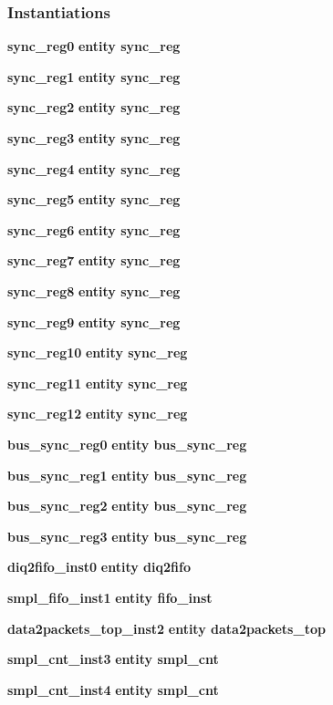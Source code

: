 \subsubsection*{Instantiations}
 \begin{DoxyCompactItemize}
\item 
{\bf sync\+\_\+reg0}  {\bfseries entity sync\+\_\+reg}   
\item 
{\bf sync\+\_\+reg1}  {\bfseries entity sync\+\_\+reg}   
\item 
{\bf sync\+\_\+reg2}  {\bfseries entity sync\+\_\+reg}   
\item 
{\bf sync\+\_\+reg3}  {\bfseries entity sync\+\_\+reg}   
\item 
{\bf sync\+\_\+reg4}  {\bfseries entity sync\+\_\+reg}   
\item 
{\bf sync\+\_\+reg5}  {\bfseries entity sync\+\_\+reg}   
\item 
{\bf sync\+\_\+reg6}  {\bfseries entity sync\+\_\+reg}   
\item 
{\bf sync\+\_\+reg7}  {\bfseries entity sync\+\_\+reg}   
\item 
{\bf sync\+\_\+reg8}  {\bfseries entity sync\+\_\+reg}   
\item 
{\bf sync\+\_\+reg9}  {\bfseries entity sync\+\_\+reg}   
\item 
{\bf sync\+\_\+reg10}  {\bfseries entity sync\+\_\+reg}   
\item 
{\bf sync\+\_\+reg11}  {\bfseries entity sync\+\_\+reg}   
\item 
{\bf sync\+\_\+reg12}  {\bfseries entity sync\+\_\+reg}   
\item 
{\bf bus\+\_\+sync\+\_\+reg0}  {\bfseries entity bus\+\_\+sync\+\_\+reg}   
\item 
{\bf bus\+\_\+sync\+\_\+reg1}  {\bfseries entity bus\+\_\+sync\+\_\+reg}   
\item 
{\bf bus\+\_\+sync\+\_\+reg2}  {\bfseries entity bus\+\_\+sync\+\_\+reg}   
\item 
{\bf bus\+\_\+sync\+\_\+reg3}  {\bfseries entity bus\+\_\+sync\+\_\+reg}   
\item 
{\bf diq2fifo\+\_\+inst0}  {\bfseries entity diq2fifo}   
\item 
{\bf smpl\+\_\+fifo\+\_\+inst1}  {\bfseries entity fifo\+\_\+inst}   
\item 
{\bf data2packets\+\_\+top\+\_\+inst2}  {\bfseries entity data2packets\+\_\+top}   
\item 
{\bf smpl\+\_\+cnt\+\_\+inst3}  {\bfseries entity smpl\+\_\+cnt}   
\item 
{\bf smpl\+\_\+cnt\+\_\+inst4}  {\bfseries entity smpl\+\_\+cnt}   
\end{DoxyCompactItemize}


